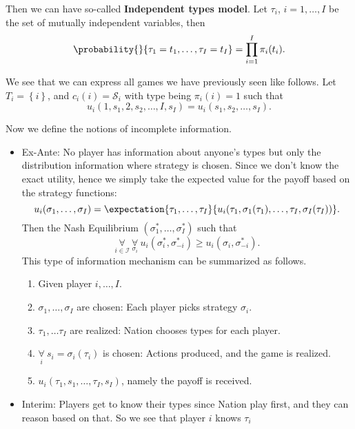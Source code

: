 \hr

Then we can have so-called \textbf{Independent types model}. Let \(\tau_{i}\), \(i = 1, \ldots , I\) be the set of mutually independent
variables, then
\[
	\probability{}{\tau_{1} = t_1, \ldots , \tau_{I} = t_{I}}=\prod\limits_{i = 1}^{I} \pi_{i}(t_{i}).
\]

\hr

We see that we can express all games we have previously seen like follows. Let \(T_{i} = \left\{i\right\}\), and
\(c_{i}(i) = \mathcal{S}_{i}\) with type being \(\pi_i(i) = 1\) such that
\[
	u_{i}(1, s_1, 2, s_2, \ldots , I, s_I) = u_{i}(s_1, s_2, \ldots , s_I).
\]

\hr

Now we define the notions of incomplete information.
\begin{itemize}
	\item Ex-Ante: No player has information about anyone's types but only the distribution information where strategy is chosen.
	      Since we don't know the exact utility, hence we simply take the expected value for the payoff based on the strategy functions:
	      \[
		      u_{i}(\sigma_1, \ldots , \sigma_I)=\expectation{\tau_1, \ldots , \tau_I}{u_{i}(\tau_1, \sigma_1(\tau_1), \ldots ,\tau_I, \sigma_I(\tau_I) )}.
	      \]
	      Then the Nash Equilibrium \((\sigma_1^{\ast}, \ldots , \sigma_{I}^{\ast})\) such that
	      \[
		      \underset{i\in\mathcal{I}}{\forall} \ \underset{\sigma_{i}}{\forall}\ u_{i}(\sigma_{i}^{\ast}, \sigma^{\ast}_{-i})\geq u_{i}(\sigma_{i}, \sigma^{\ast}_{-i}).
	      \]
	      This type of information mechanism can be summarized as follows.
	      \begin{enumerate}
		      \item Given player \(i, \ldots , I\).
		      \item \(\sigma_1, \ldots , \sigma_{I}\) are chosen: Each player picks strategy \(\sigma_{i}\).
		      \item \(\tau_1, \ldots \tau_{I}\) are realized: Nation chooses types for each player.
		      \item \(\underset{i}{\forall }\ s_{i} = \sigma_{i}(\tau_{i})\) is chosen: Actions produced, and the game is realized.
		      \item \(u_{i}(\tau_1, s_1, \ldots , \tau_{I}, s_{I})\), namely the payoff is received.
	      \end{enumerate}
	\item Interim: Players get to know their types since Nation play first, and they can reason based on that. So we see that player \(i\) knows \(\tau_{i}\)

\end{itemize}
